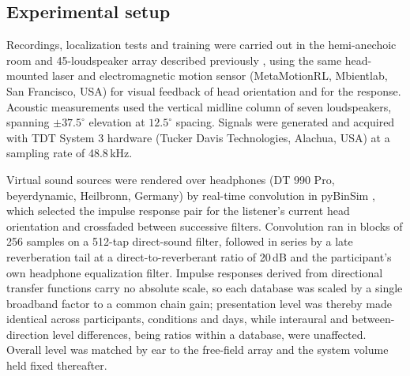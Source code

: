
\subsection{Experimental setup}

Recordings, localization tests and training were carried out in the
hemi-anechoic room and 45-loudspeaker array described previously
, using the same head-mounted laser and electromagnetic motion sensor
(MetaMotionRL, Mbientlab, San Francisco, USA) for visual feedback of head
orientation and for the response. Acoustic measurements used the vertical
midline column of seven loudspeakers, spanning $\pm37.5^\circ$ elevation at
$12.5^\circ$ spacing. Signals were generated and acquired with TDT System 3
hardware (Tucker Davis Technologies, Alachua, USA) at a sampling rate of
48.8\,kHz.

Virtual sound sources were rendered over headphones (DT 990 Pro,
beyerdynamic, Heilbronn, Germany) by real-time convolution in pyBinSim
, which selected the impulse response pair for the listener's current head
orientation and crossfaded between successive filters. Convolution ran in
blocks of 256 samples on a 512-tap direct-sound filter, followed in series by a
late reverberation tail at a direct-to-reverberant ratio of 20\,dB and the
participant's own headphone equalization filter. Impulse responses derived
from directional transfer functions carry no absolute scale, so each database
was scaled by a single broadband factor to a common chain gain; presentation
level was thereby made identical across participants, conditions and days,
while interaural and between-direction level differences, being ratios within
a database, were unaffected. Overall level was matched by ear to the
free-field array and the system volume held fixed thereafter.

